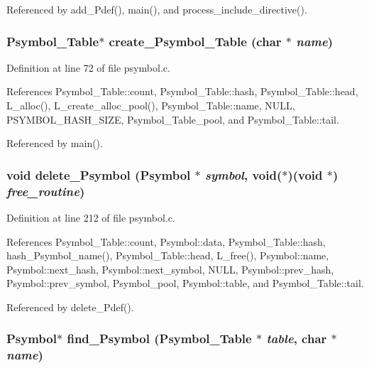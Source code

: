 Referenced by add\_\-Pdef(), main(), and process\_\-include\_\-directive().
\subsubsection{\setlength{\rightskip}{0pt plus 5cm}\bf{Psymbol\_\-Table}$\ast$ create\_\-Psymbol\_\-Table (char $\ast$ {\em name})}\label{psymbol_8h_8f6a98d5bf33556e5bbe7f8e940a0f81}




Definition at line 72 of file psymbol.c.

References Psymbol\_\-Table::count, Psymbol\_\-Table::hash, Psymbol\_\-Table::head, L\_\-alloc(), L\_\-create\_\-alloc\_\-pool(), Psymbol\_\-Table::name, NULL, PSYMBOL\_\-HASH\_\-SIZE, Psymbol\_\-Table\_\-pool, and Psymbol\_\-Table::tail.

Referenced by main().
\subsubsection{\setlength{\rightskip}{0pt plus 5cm}void delete\_\-Psymbol (\bf{Psymbol} $\ast$ {\em symbol}, void($\ast$)(void $\ast$) {\em free\_\-routine})}\label{psymbol_8h_21ac4b8e5e7b5a95b9d3cac63c5a6562}




Definition at line 212 of file psymbol.c.

References Psymbol\_\-Table::count, Psymbol::data, Psymbol\_\-Table::hash, hash\_\-Psymbol\_\-name(), Psymbol\_\-Table::head, L\_\-free(), Psymbol::name, Psymbol::next\_\-hash, Psymbol::next\_\-symbol, NULL, Psymbol::prev\_\-hash, Psymbol::prev\_\-symbol, Psymbol\_\-pool, Psymbol::table, and Psymbol\_\-Table::tail.

Referenced by delete\_\-Pdef().
\subsubsection{\setlength{\rightskip}{0pt plus 5cm}\bf{Psymbol}$\ast$ find\_\-Psymbol (\bf{Psymbol\_\-Table} $\ast$ {\em table}, char $\ast$ {\em name})}\label{psymbol_8h_dcef8f7f2490ff89644f958db15b07cd}




